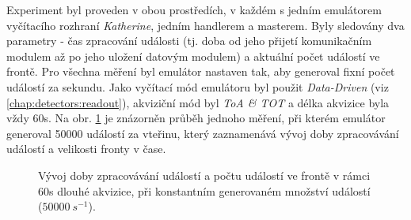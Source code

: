 Experiment byl proveden v obou prostředích, v každém s jedním emulátorem vyčítacího rozhraní \textit{Katherine}, jedním handlerem a masterem. Byly sledovány dva parametry - čas zpracování události (tj. doba od jeho přijetí komunikačním modulem až po jeho uložení datovým modulem) a aktuální počet událostí ve frontě. Pro všechna měření byl emulátor nastaven tak, aby generoval fixní počet událostí za sekundu. Jako vyčítací mód emulátoru byl použit \textit{Data-Driven} (viz \ref{chap:detectors:readout}), akviziční mód byl \textit{ToA \& TOT} a délka akvizice byla vždy \unit{60}{s}. Na obr. \ref{fig:test:exp1:jedna_akvizice_50k_udalosti} je znázorněn průběh jednoho měření, při kterém emulátor generoval 50000 událostí za vteřinu, který zaznamenává vývoj doby zpracovávání událostí a velikosti fronty v čase.

\begin{figure}[h]
    \centering

    \caption{Vývoj doby zpracovávání událostí a počtu událostí ve frontě v rámci \unit{60}{s} dlouhé akvizice, při konstantním generovaném množství událostí ($50000~s^{-1}$).}
    \label{fig:test:exp1:jedna_akvizice_50k_udalosti}
\end{figure}

